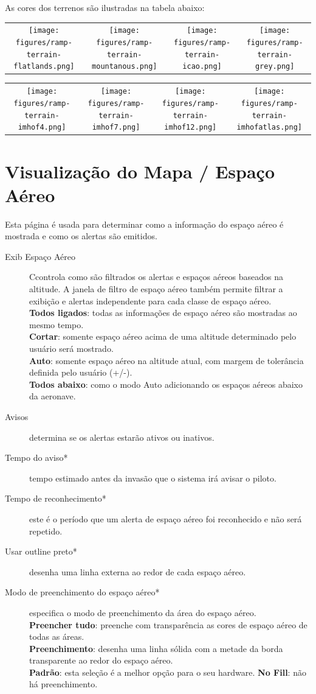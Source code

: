 As cores dos terrenos são ilustradas na tabela abaixo:

\begin{longtable}{c c c c}
\texttt{[image: figures/ramp-terrain-flatlands.png]}&
\texttt{[image: figures/ramp-terrain-mountanous.png]}&
\texttt{[image: figures/ramp-terrain-icao.png]}&
\texttt{[image: figures/ramp-terrain-grey.png]}
\end{longtable}

\begin{longtable}{c c c c}
\texttt{[image: figures/ramp-terrain-imhof4.png]}&
\texttt{[image: figures/ramp-terrain-imhof7.png]}&
\texttt{[image: figures/ramp-terrain-imhof12.png]}&
\texttt{[image: figures/ramp-terrain-imhofatlas.png]}
\end{longtable}


\section{Visualização do Mapa / Espaço Aéreo }

Esta página é usada para determinar como a informação do espaço aéreo é mostrada e como os alertas são emitidos.

\begin{description}
\item[Exib Espaço Aéreo]  Ccontrola como são filtrados os alertas e espaços aéreos baseados na altitude.  A janela de filtro de espaço aéreo também permite filtrar a exibição e alertas independente para cada classe de espaço aéreo. \\
  {\bf Todos ligados}: todas as informações de espaço aéreo são mostradas ao mesmo tempo. \\
  {\bf Cortar}: somente espaço aéreo acima de uma altitude determinado pelo usuário será mostrado. \\
  {\bf Auto}: somente espaço aéreo na altitude atual, com margem de tolerância definida pelo usuário (+/-).
 \\
  {\bf Todos abaixo}:  como o modo Auto adicionando os espaços aéreos abaixo da aeronave.
\item[Avisos] determina se os alertas estarão ativos ou inativos.
\item[Tempo do aviso*]  tempo estimado antes da invasão que o sistema irá avisar o piloto.
\item[Tempo de reconhecimento*]  este é o período que um alerta de espaço aéreo foi reconhecido e não será repetido.
\item[Usar outline preto*]  desenha uma linha externa ao redor de cada espaço aéreo.
\item[Modo de preenchimento do espaço aéreo*]  especifica o modo de preenchimento da área do espaço aéreo. \\
  {\bf Preencher tudo}:  preenche com transparência as cores de espaço aéreo de todas as áreas. \\
  {\bf Preenchimento}: desenha uma linha sólida com a metade da borda transparente ao redor do espaço aéreo. \\
  {\bf Padrão}:  esta seleção é a melhor opção para o seu hardware.
  {\bf No Fill}: não há preenchimento.
\end{description}


